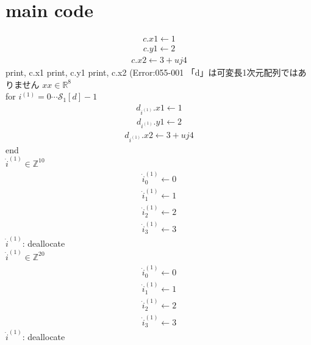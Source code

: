 \documentclass[a4paper,fleqn]{ltjsarticle}
\begin{document}
\section{main code}
\begin{align}
c.x1 \leftarrow 1
\end{align}
\begin{align}
c.y1 \leftarrow 2
\end{align}
\begin{align}
c.x2 \leftarrow 3+uj 4
\end{align}
print, c.x1
print, c.y1
print, c.x2
(Error:055-001 「d」は可変長1次元配列ではありません
$xx \in \mathbb{R}^{8}$\\
for $i^{(1)}=0\cdots \mathcal{S}_1[d]-1$\\
  \begin{align}
  d_{i^{(1)}}.x1 \leftarrow 1
  \end{align}
  \begin{align}
  d_{i^{(1)}}.y1 \leftarrow 2
  \end{align}
  \begin{align}
  d_{i^{(1)}}.x2 \leftarrow 3+uj 4
  \end{align}
end\\
$\dot{i}^{(1)} \in \mathbb{Z}^{10}$\\
\begin{align}
\dot{i}^{(1)}_{0} \leftarrow 0
\end{align}
\begin{align}
\dot{i}^{(1)}_{1} \leftarrow 1
\end{align}
\begin{align}
\dot{i}^{(1)}_{2} \leftarrow 2
\end{align}
\begin{align}
\dot{i}^{(1)}_{3} \leftarrow 3
\end{align}
$\dot{i}^{(1)}$: deallocate\\
$\dot{i}^{(1)} \in \mathbb{Z}^{20}$\\
\begin{align}
\dot{i}^{(1)}_{0} \leftarrow 0
\end{align}
\begin{align}
\dot{i}^{(1)}_{1} \leftarrow 1
\end{align}
\begin{align}
\dot{i}^{(1)}_{2} \leftarrow 2
\end{align}
\begin{align}
\dot{i}^{(1)}_{3} \leftarrow 3
\end{align}
$\dot{i}^{(1)}$: deallocate\\
\end{document}
